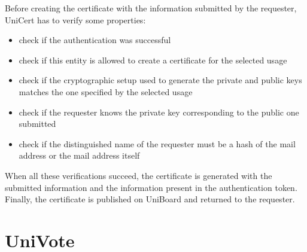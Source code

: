 \documentclass[bibtotoc,halfparskip,oneside]{scrreprt}
\begin{document}
Before creating the certificate with the information submitted by the requester, UniCert has to verify some properties:
\begin{itemize}
	\item check if the authentication was successful
	\item check if this entity is allowed to create a certificate for the selected usage
	\item check if the cryptographic setup used to generate the private and public keys matches the one specified by the selected usage
	\item check if the requester knows the private key corresponding to the public one submitted
	\item check if the distinguished name of the requester must be a hash of the mail address or the mail address itself
\end{itemize}

When all these verifications succeed, the certificate is generated with the submitted information and the information present in the authentication token. Finally, the certificate is published on UniBoard and returned to the requester.









\chapter{UniVote}

\end{document}
